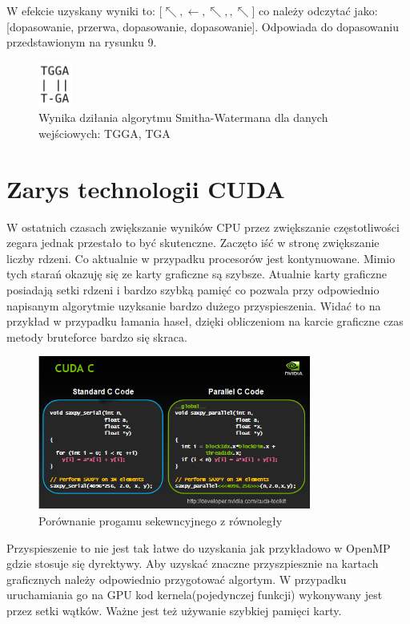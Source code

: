 \documentclass[a4paper,12pt]{article}
\begin{document}
W efekcie uzyskany wyniki to: [$\nwarrow, \leftarrow, \nwarrow, , \nwarrow$] co należy odczytać jako: [dopasowanie, przerwa, dopasowanie, dopasowanie]. 
Odpowiada do dopasowaniu przedstawionym na rysunku 9. 
\begin{figure}[H]
  \vspace{5pt}
  \centering
  \begin{center}
  \includegraphics[width=0.1\textwidth]{images/uzyskaneDopasowanie.png}
  \end{center}
  \caption{Wynika dziłania algorytmu Smitha-Watermana dla danych wejściowych: TGGA, TGA}
 \end{figure}

\section*{Zarys technologii CUDA}
W ostatnich czasach zwiększanie wyników CPU przez zwiększanie częstotliwości zegara jednak przestało to być skutenczne. Zaczęto iść w stronę zwiększanie liczby rdzeni. Co aktualnie w przypadku procesorów jest kontynuowane. Mimio tych starań okazuję się ze karty graficzne są szybsze.
	Atualnie karty graficzne posiadają setki rdzeni i bardzo szybką pamięć co pozwala przy odpowiednio napisanym algorytmie uzyksanie bardzo dużego przyspieszenia. Widać to na przykład w przypadku łamania haseł, dzięki obliczeniom na karcie graficzne czas metody bruteforce bardzo się skraca. 
\begin{figure}[H]
  \vspace{5pt}
  \centering
  \begin{center}
  \includegraphics[width=0.8\textwidth]{images/cuda.png}
  \end{center}
  \caption{Porównanie progamu sekewncyjnego z równoległy }
 \end{figure}
 Przyspieszenie to nie jest tak łatwe do uzyskania jak przykładowo w OpenMP gdzie stosuje się dyrektywy. Aby uzyskać znaczne przyszpiesznie na kartach graficznych należy odpowiednio przygotować algortym. W przypadku uruchamiania go na GPU kod kernela(pojedynczej funkcji) wykonywany jest przez setki wątków. Ważne jest też używanie szybkiej pamięci karty.
\end{document}

